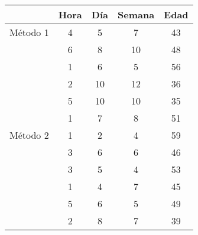 \begin{enumerate}
\begin{center}
  \begin{tabular}{|l|l|l|l|l|}
\cline{2-5}
\multicolumn{1}{c|}{} & \multicolumn{1}{c|}{Hora} & \multicolumn{1}{c|}{Día} & \multicolumn{1}{c|}{Semana} & \multicolumn{1}{c|}{Edad} \\
\hline
\multicolumn{1}{|c|}{Método 1} & \multicolumn{1}{c|}{4} & \multicolumn{1}{c|}{5} & \multicolumn{1}{c|}{7} & \multicolumn{1}{c|}{43} \\
\cline{2-5}
\multicolumn{1}{|c|}{} & \multicolumn{1}{c|}{6} & \multicolumn{1}{c|}{8} & \multicolumn{1}{c|}{10} & \multicolumn{1}{c|}{48} \\
\cline{2-5}
\multicolumn{1}{|c|}{} & \multicolumn{1}{c|}{1} & \multicolumn{1}{c|}{6} & \multicolumn{1}{c|}{5} & \multicolumn{1}{c|}{56} \\
\cline{2-5}
\multicolumn{1}{|c|}{} & \multicolumn{1}{c|}{2} & \multicolumn{1}{c|}{10} & \multicolumn{1}{c|}{12} & \multicolumn{1}{c|}{36} \\
\cline{2-5}
\multicolumn{1}{|c|}{} & \multicolumn{1}{c|}{5} & \multicolumn{1}{c|}{10} & \multicolumn{1}{c|}{10} & \multicolumn{1}{c|}{35} \\
\cline{2-5}
\multicolumn{1}{|c|}{} & \multicolumn{1}{c|}{1} & \multicolumn{1}{c|}{7} & \multicolumn{1}{c|}{8} & \multicolumn{1}{c|}{51} \\
\hline
\multicolumn{1}{|c|}{Método 2} & \multicolumn{1}{c|}{1} & \multicolumn{1}{c|}{2} & \multicolumn{1}{c|}{4} & \multicolumn{1}{c|}{59} \\
\cline{2-5}
\multicolumn{1}{|c|}{} & \multicolumn{1}{c|}{3} & \multicolumn{1}{c|}{6} & \multicolumn{1}{c|}{6} & \multicolumn{1}{c|}{46} \\
\cline{2-5}
\multicolumn{1}{|c|}{} & \multicolumn{1}{c|}{3} & \multicolumn{1}{c|}{5} & \multicolumn{1}{c|}{4} & \multicolumn{1}{c|}{53} \\
\cline{2-5}
\multicolumn{1}{|c|}{} & \multicolumn{1}{c|}{1} & \multicolumn{1}{c|}{4} & \multicolumn{1}{c|}{7} & \multicolumn{1}{c|}{45} \\
\cline{2-5}
\multicolumn{1}{|c|}{} & \multicolumn{1}{c|}{5} & \multicolumn{1}{c|}{6} & \multicolumn{1}{c|}{5} & \multicolumn{1}{c|}{49} \\
\cline{2-5}
\multicolumn{1}{|c|}{} & \multicolumn{1}{c|}{2} & \multicolumn{1}{c|}{8} & \multicolumn{1}{c|}{7} & \multicolumn{1}{c|}{39} \\
\hline
\end{tabular}

\end{center}


\end{enumerate}
